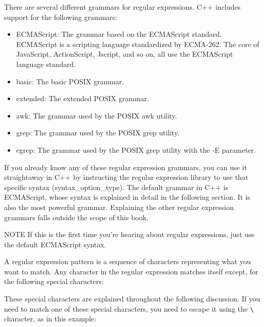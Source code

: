 There are several different grammars for regular expressions. C++ includes support for the following grammars:

\begin{itemize}
\item
ECMAScript: The grammar based on the ECMAScript standard. ECMAScript is a scripting language standardized by ECMA-262. The core of JavaScript, ActionScript, Jscript, and so on, all use the ECMAScript language standard.

\item
basic: The basic POSIX grammar.

\item
extended: The extended POSIX grammar.

\item
awk: The grammar used by the POSIX awk utility.

\item
grep: The grammar used by the POSIX grep utility.

\item
egrep: The grammar used by the POSIX grep utility with the -E parameter.
\end{itemize}

If you already know any of these regular expression grammars, you can use it straightaway in C++ by instructing the regular expression library to use that specific syntax (syntax\_option\_type). The default grammar in C++ is ECMAScript, whose syntax is explained in detail in the following section. It is also the most powerful grammar. Explaining the other regular expression grammars falls outside the scope of this book.

\begin{myNotic}{NOTE}
If this is the first time you’re hearing about regular expressions, just use the default ECMAScript syntax.
\end{myNotic}


A regular expression pattern is a sequence of characters representing what you want to match. Any character in the regular expression matches itself except, for the following special characters:


These special characters are explained throughout the following discussion. If you need to match one of these special characters, you need to escape it using the \verb|\| character, as in this example:

